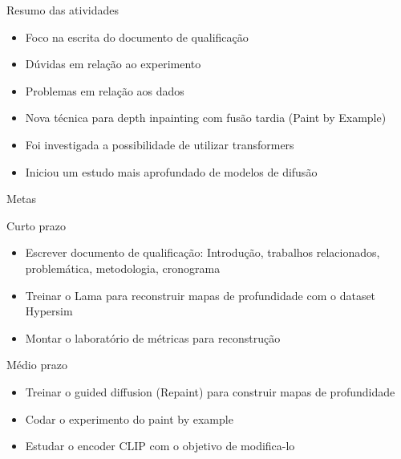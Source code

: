 \documentclass[aspectratio=169]{beamer}
\begin{document}
\begin{frame}{Resumo das atividades}
    \begin{itemize}
        \item Foco na escrita do documento de qualificação
        \item Dúvidas em relação ao experimento
        \item Problemas em relação aos dados
        \item Nova técnica para depth inpainting com fusão tardia (Paint by Example)
        \item Foi investigada a possibilidade de utilizar transformers
        \item Iniciou um estudo mais aprofundado de modelos de difusão
    \end{itemize}
\end{frame}

\begin{frame}{Metas}
    \begin{block}{Curto prazo}

\begin{itemize}
    \item Escrever documento de qualificação: Introdução, trabalhos relacionados, problemática, metodologia, cronograma
    \item Treinar o Lama para reconstruir mapas de profundidade com o dataset Hypersim
    \item Montar o laboratório de métricas para reconstrução
\end{itemize}


\end{block}

    \begin{block}{Médio prazo}
\begin{itemize}
    \item Treinar o guided diffusion (Repaint) para construir mapas de profundidade
    \item Codar o experimento do paint by example
    \item Estudar o encoder CLIP com o objetivo de modifica-lo
    \end{itemize}
\end{block}

\end{frame}

\end{document}
